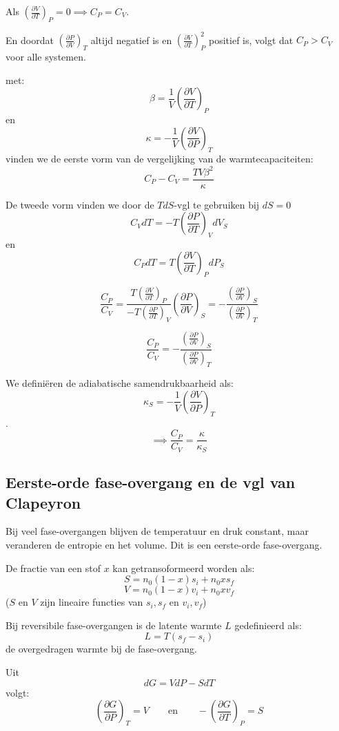 Als \(\left(\frac{\partial V}{\partial T}\right)_P = 0 \implies C_P = C_V\).

En doordat \(\left(\frac{\partial P}{\partial V}\right)_T\) altijd negatief is en \(\left(\frac{\partial V}{\partial T}\right)^2_P\) positief is, volgt dat \(C_P > C_V\) voor alle systemen.


met:
\[\beta = \frac{1}{V} \left(\frac{\partial V}{\partial T}\right)_P\]
en
\[\kappa = -\frac{1}{V} \left(\frac{\partial V}{\partial P}\right)_T\]
vinden we de eerste vorm van de vergelijking van de warmtecapaciteiten:
\[\boxed{C_P - C_V = \frac{TV\beta^2}{\kappa}}\]

De tweede vorm vinden we door de \(TdS\)-vgl te gebruiken bij \(dS = 0\)
\[C_V dT = - T\left(\frac{\partial P}{\partial T}\right)_V dV_S\]
en
\[C_PdT = T \left(\frac{\partial V}{\partial T}\right)_P dP_S\]

\[\frac{C_P}{C_V} = \frac{T \left(\frac{\partial V}{\partial T}\right)_P}{- T\left(\frac{\partial P}{\partial T}\right)_V} \left(\frac{\partial P}{\partial V}\right)_S = -\frac{\left(\frac{\partial P}{\partial V}\right)_S}{\left(\frac{\partial P}{\partial V}\right)_T}\]

\[\boxed{\frac{C_P}{C_V} = -\frac{\left(\frac{\partial P}{\partial V}\right)_S}{\left(\frac{\partial P}{\partial V}\right)_T}}\]

We definiëren de adiabatische samendrukbaarheid als:
\[\kappa_S = -\frac{1}{V} \left(\frac{\partial V}{\partial P}\right)_T\].
\[\implies \frac{C_P}{C_V} = \frac{\kappa}{\kappa_S}\]

\subsection{Eerste-orde fase-overgang en de vgl van Clapeyron}

Bij veel fase-overgangen blijven de temperatuur en druk constant, maar veranderen de entropie en het volume. Dit is een eerste-orde fase-overgang.

De fractie van een stof \(x\) kan getransoformeerd worden als:
\[S = n_0(1-x)s_i + n_0 x s_f\]
\[V = n_0(1-x)v_i + n_0 x v_f\]
(\(S\) en \(V\) zijn lineaire functies van \(s_i, s_f\) en \(v_i, v_f\))

Bij reversibile fase-overgangen is de latente warmte \(L\) gedefinieerd als:
\[L = T(s_f - s_i)\]
de overgedragen warmte bij de fase-overgang.

Uit
\[dG = VdP-SdT\]
volgt:
\[\left(\frac{\partial G}{\partial P}\right)_T = V \qquad\text{en}\qquad -\left(\frac{\partial G}{\partial T}\right)_P = S\]

